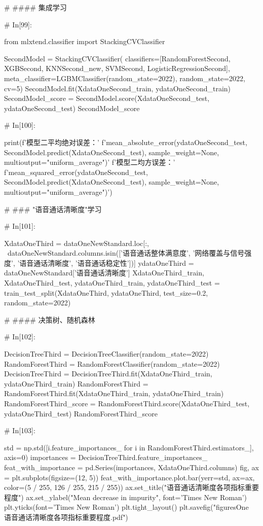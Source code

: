 \documentclass{MathorCupmodeling}
\begin{document}
\begin{python}
	# #### 集成学习
	
	# In[99]:
	
	
	from mlxtend.classifier import StackingCVClassifier
	
	SecondModel = StackingCVClassifier(
		classifiers=[RandomForestSecond, XGBSecond, KNNSecond_new, SVMSecond, LogisticRegressionSecond],
		meta_classifier=LGBMClassifier(random_state=2022), random_state=2022, cv=5)
	SecondModel.fit(XdataOneSecond_train, ydataOneSecond_train)
	SecondModel_score = SecondModel.score(XdataOneSecond_test, ydataOneSecond_test)
	SecondModel_score
	
	# In[100]:
	
	
	print(f'模型二平均绝对误差：'
		  f'{mean_absolute_error(ydataOneSecond_test, SecondModel.predict(XdataOneSecond_test), sample_weight=None, multioutput="uniform_average")}\n'
		  f'模型二均方误差：'
		  f'{mean_squared_error(ydataOneSecond_test, SecondModel.predict(XdataOneSecond_test), sample_weight=None, multioutput="uniform_average")}')
	
	# ### "语音通话清晰度"学习
	
	# In[101]:
	
	
	XdataOneThird = dataOneNewStandard.loc[:, ~dataOneNewStandard.columns.isin(['语音通话整体满意度', '网络覆盖与信号强度', '语音通话清晰度', '语音通话稳定性'])]
	ydataOneThird = dataOneNewStandard['语音通话清晰度']
	XdataOneThird_train, XdataOneThird_test, ydataOneThird_train, ydataOneThird_test = train_test_split(XdataOneThird, ydataOneThird, test_size=0.2, random_state=2022)
	
	# #### 决策树、随机森林
	
	# In[102]:
	
	
	DecisionTreeThird = DecisionTreeClassifier(random_state=2022)
	RandomForestThird = RandomForestClassifier(random_state=2022)
	DecisionTreeThird = DecisionTreeThird.fit(XdataOneThird_train, ydataOneThird_train)
	RandomForestThird = RandomForestThird.fit(XdataOneThird_train, ydataOneThird_train)
	RandomForestThird_score = RandomForestThird.score(XdataOneThird_test, ydataOneThird_test)
	RandomForestThird_score
	
	# In[103]:
	
	
	std = np.std([i.feature_importances_ for i in RandomForestThird.estimators_], axis=0)
	importances = DecisionTreeThird.feature_importances_
	feat_with_importance = pd.Series(importances, XdataOneThird.columns)
	fig, ax = plt.subplots(figsize=(12, 5))
	feat_with_importance.plot.bar(yerr=std, ax=ax, color=(5 / 255, 126 / 255, 215 / 255))
	ax.set_title("语音通话清晰度各项指标重要程度")
	ax.set_ylabel("Mean decrease in impurity", font='Times New Roman')
	plt.yticks(font='Times New Roman')
	plt.tight_layout()
	plt.savefig("figuresOne\\[附件1]语音通话清晰度各项指标重要程度.pdf")
	

\end{python}
\end{document}
